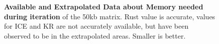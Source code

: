 \begin{figure}[t]
    \begin{centering}
        \caption[Memory needs iterating 50kb]
        {\textbf{Available and Extrapolated Data about Memory needed during
        iteration} of the 50kb matrix. Rust value is accurate, values for ICE
        and KR are not accurately available, but have been observed to be in
        the extrapolated areas. Smaller is better.}
        \label{fig:memiter50}
    \end{centering}
\end{figure}



